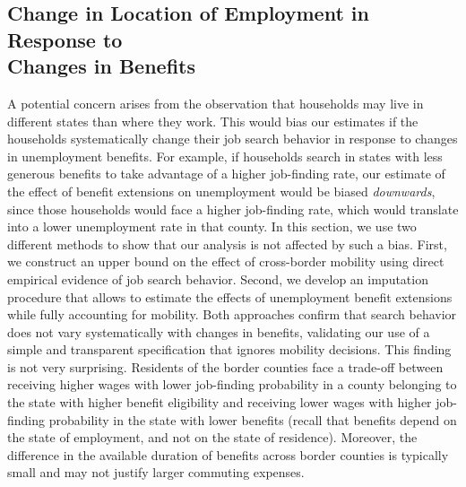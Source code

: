 \documentclass[12pt]{article}
\newcommand{\1}{\mathbf{1}}
\begin{document}
\begin{appendix}
\section{Change in Location of Employment in Response to \\ Changes in Benefits}
\label{sec:mobility}

 A potential concern arises from the observation that households may live in different states than where they work. This would bias our estimates if the households systematically change their job search behavior in response to changes in unemployment benefits. For example, if households search in states with less generous benefits to take advantage of a higher job-finding rate, our estimate of the effect of benefit extensions on unemployment would be biased \emph{downwards}, since those households would face a higher job-finding rate, which would translate into a lower unemployment rate in that county. In this section, we use two different methods to show that our analysis is not affected by such a bias. First, we construct an upper bound on the effect of cross-border mobility using direct empirical evidence of job search behavior. Second, we develop an imputation procedure that allows to estimate the effects of unemployment benefit extensions while fully accounting for mobility. Both approaches confirm that search behavior does not vary systematically with changes in benefits, validating our use of a simple and transparent specification that ignores mobility decisions.
This finding is not very surprising. Residents of the border counties face a trade-off between receiving higher wages with lower job-finding probability in a county belonging to the state with higher benefit eligibility and receiving lower wages with higher job-finding probability in the state with lower benefits (recall that benefits depend on the state of employment, and not on the state of residence). Moreover, the difference in the available duration of benefits across border counties is typically small and may not justify larger commuting expenses.


\end{appendix}
\end{document}
